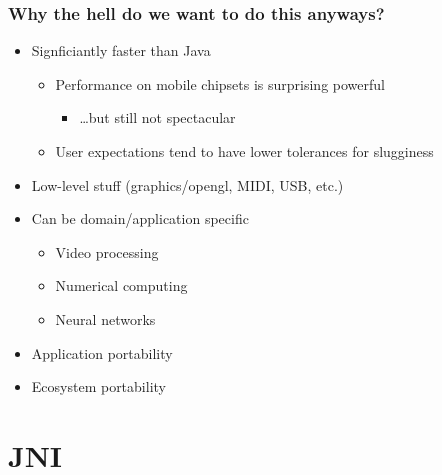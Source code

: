 \documentclass[10pt,mathserif]{beamer}
\begin{document}
	\begin{frame}
		\frametitle{Why the hell do we want to do this anyways?}

		\begin{itemize}
			\item Signficiantly faster than Java
			\begin{itemize}
				\item Performance on mobile chipsets is surprising powerful
				\begin{itemize}
					\item \dots but still not spectacular
				\end{itemize}
				\item User expectations tend to have lower tolerances for slugginess
			\end{itemize}
			\item Low-level stuff (graphics/opengl, MIDI, USB, etc.)
			\item Can be domain/application specific
			\begin{itemize}
				\item Video processing
				\item Numerical computing
				\item Neural networks
			\end{itemize}
			\item Application portability
			\item Ecosystem portability
		\end{itemize}
	\end{frame}


	\section{JNI}
\end{document}
